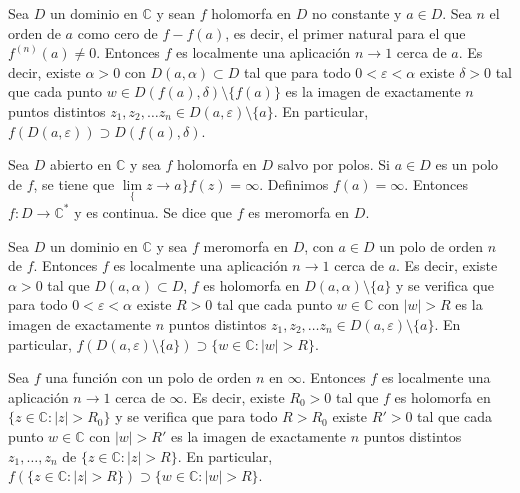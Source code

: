 \begin{theorem}
    Sea $D$ un dominio en $\mathbb{C}$ y sean $f$ holomorfa en $D$ no constante y $a \in D$.
    Sea $n$ el orden de $a$ como cero de $f-f(a)$, es decir, el primer natural para el que $f^{(n)}(a) \neq 0$.
    Entonces $f$ es localmente una aplicación $n \to 1$ cerca de $a$.
    Es decir, existe $\alpha > 0$ con $D(a, \alpha) \subset D$ tal que para todo $0 < \varepsilon < \alpha$ existe $\delta > 0$ tal que cada punto $w \in D(f(a), \delta) \setminus \{f(a)\}$ es la imagen de exactamente $n$ puntos distintos $z_1, z_2, \dots z_n \in D(a, \varepsilon) \setminus \{a\}$.
    En particular, $f(D(a, \varepsilon)) \supset D(f(a), \delta)$.
\end{theorem}

\begin{definition}
    Sea $D$ abierto en $\mathbb{C}$ y sea $f$ holomorfa en $D$ salvo por polos.
    Si $a \in D$ es un polo de $f$, se tiene que $\lim\limits_\{z \to a\} f(z) = \infty$.
    Definimos $f(a) = \infty$.
    Entonces $f: D \to \mathbb{C}^\ast$ y es continua.
    Se dice que $f$ es meromorfa en $D$.
\end{definition}

\begin{theorem}
    Sea $D$ un dominio en $\mathbb{C}$ y sea $f$ meromorfa en $D$, con $a \in D$ un polo de orden $n$ de $f$.
    Entonces $f$ es localmente una aplicación $n \to 1$ cerca de $a$.
    Es decir, existe $\alpha > 0$ tal que $D(a, \alpha) \subset D$, $f$ es holomorfa en $D(a, \alpha) \setminus \{a\}$ y se verifica que para todo $0 < \varepsilon < \alpha$ existe $R > 0$ tal que cada punto $w \in \mathbb{C}$ con $|w| > R$ es la imagen de exactamente $n$ puntos distintos $z_1, z_2, \dots z_n \in D(a, \varepsilon) \setminus \{a\}$.
    En particular, $f(D(a, \varepsilon) \setminus \{a\}) \supset \{w \in \mathbb{C} : |w| > R\}$.
\end{theorem}


\begin{theorem}
    Sea $f$ una función con un polo de orden $n$ en $\infty$.
    Entonces $f$ es localmente una aplicación $n \to 1$ cerca de $\infty$.
    Es decir, existe $R_0 > 0$ tal que $f$ es holomorfa en $\{z \in \mathbb{C} : |z| > R_0\}$ y se verifica que para todo $R > R_0$ existe $R' > 0$ tal que cada punto $w \in \mathbb{C}$ con $|w| > R'$ es la imagen de exactamente $n$ puntos distintos $z_1, \dots, z_n$ de $\{z \in \mathbb{C} : |z| > R\}$.
    En particular, $f(\{z \in \mathbb{C} : |z| > R\}) \supset \{w \in \mathbb{C} : |w| > R\}$.
\end{theorem}

